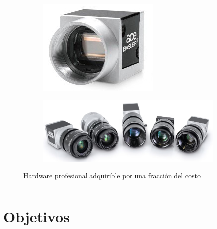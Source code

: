 \documentclass[aspectratio=169]{beamer}
\begin{document}
\begin{frame}{~}
\begin{columns}
\begin{column}{0.6\textwidth}
      \begin{figure}
        \begin{subfigure}{0.49\textwidth}
          \centering
          \includegraphics[width=0.6\linewidth]{img/basler-camera.jpg}
        \end{subfigure}
        \begin{subfigure}{0.49\textwidth}
          \centering
          \includegraphics[width=0.8\linewidth]{img/basler-cameras-with-lens.png}
        \end{subfigure}
        \caption{Hardware profesional adquirible por una fracción del costo}
      \end{figure}


    \end{column}
  \end{columns}
\end{frame}

\section{Objetivos}
\end{document}
